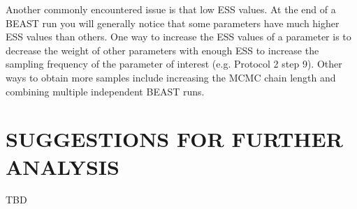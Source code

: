 \documentclass{article}
\begin{document}
\begin{multicols}{2}
Another commonly encountered issue is that low ESS values. At the end of a BEAST run you will generally notice that some parameters have much higher ESS values than others. One way to increase the ESS values of a parameter is to decrease the weight of other parameters with enough ESS to increase the sampling frequency of the parameter of interest (e.g. Protocol 2 step 9). Other ways to obtain more samples include increasing the MCMC chain length and combining multiple independent BEAST runs.

\section*{SUGGESTIONS FOR FURTHER ANALYSIS}

TBD




\end{multicols}
\end{document}
